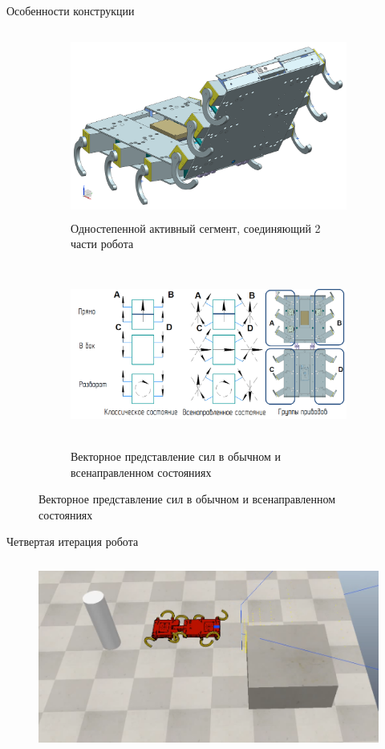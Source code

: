 \documentclass[aspectratio=169,xcolor=table,10pt]{beamer}
\begin{document}
\begin{frame}[c]{Особенности конструкции}
    \framesubtitle{}
    \begin{figure}[H]
        \begin{subfigure}{0.39\textwidth}
            \centering\includegraphics[height=6cm,width=1\textwidth,keepaspectratio]{17.png}
            \caption{Одностепенной активный сегмент, соединяющий 2 части робота}
        \end{subfigure}
        \begin{subfigure}{0.59\textwidth}
            \centering\includegraphics[height=6cm,width=1\textwidth,keepaspectratio]{vector_representation_rus}
            \caption{Векторное представление сил в обычном и всенаправленном состояниях}
        \end{subfigure}
    \end{figure}
\end{frame}

\begin{frame}[t]{Четвертая итерация робота}
    \framesubtitle{}
    \begin{figure}[H]
        \centering\includegraphics[height=6cm,width=1\textwidth,keepaspectratio]{sidestep_segment_video_preview.png}
    \end{figure}
\end{frame}
\end{document}
